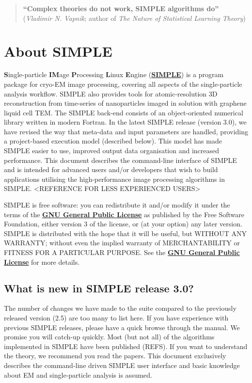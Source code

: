 \documentclass[a4paper,11pt]{article}
\begin{document}
\begin{quote}
\textbf{``Complex theories do not work, SIMPLE algorithms do''}\\(\textit{Vladimir N. Vapnik}; author of \textit{The Nature of Statistical Learning Theory})
\end{quote}
\clearpage

\tableofcontents{}
\clearpage

\section{About SIMPLE}

\textbf{S}ingle-particle \textbf{IM}age \textbf{P}rocessing \textbf{L}inux \textbf{E}ngine (\href{www.simplecryoem.com}{\textbf{\textcolor{BurntOrange}{SIMPLE}}}) is a program package for cryo-EM image processing, covering all aspects of the single-particle analysis workflow. SIMPLE also provides tools for atomic-resolution 3D reconstruction from time-series of nanoparticles imaged in solution with graphene liquid cell TEM. The SIMPLE back-end consists of an object-oriented numerical library written in modern Fortran. In the latest SIMPLE release (version 3.0), we have revised the way that meta-data and input parameters are handled, providing a project-based execution model (described below). This model has made SIMPLE easier to use, improved output data organisation and increased performance. This document describes the command-line interface of SIMPLE and is intended for advanced users and/or developers that wish to build applications utilising the high-performance image processing algorithms in SIMPLE. <REFERENCE FOR LESS EXPERIENCED USERS>
 
SIMPLE is free software: you can redistribute it and/or modify it under the terms of the \href{http://www.gnu.org/copyleft/gpl.html}{\textbf{\textcolor{BurntOrange}{GNU General Public License}}} as published by the Free Software Foundation, either version 3 of the license, or (at your option) any later version. SIMPLE is distributed with the hope that it will be useful, but WITHOUT ANY WARRANTY; without even the implied warranty of MERCHANTABILITY or FITNESS FOR A PARTICULAR PURPOSE. See the \href{http://www.gnu.org/copyleft/gpl.html}{\textbf{\textcolor{BurntOrange}{GNU General Public License}}} for more details.

\subsection{What is new in SIMPLE release 3.0?}
The number of changes we have made to the suite compared to the previously released version (2.5) are too many to list here. If you have experience with previous SIMPLE releases, please have a quick browse through the manual. We promise you will catch-up quickly. Most (but not all) of the algorithms implemented in SIMPLE have been published (REFS). If you want to understand the theory, we recommend you read the papers. This document exclusively describes the command-line driven SIMPLE user interface and basic knowledge about EM and single-particle analysis is assumed. 
\end{document}
